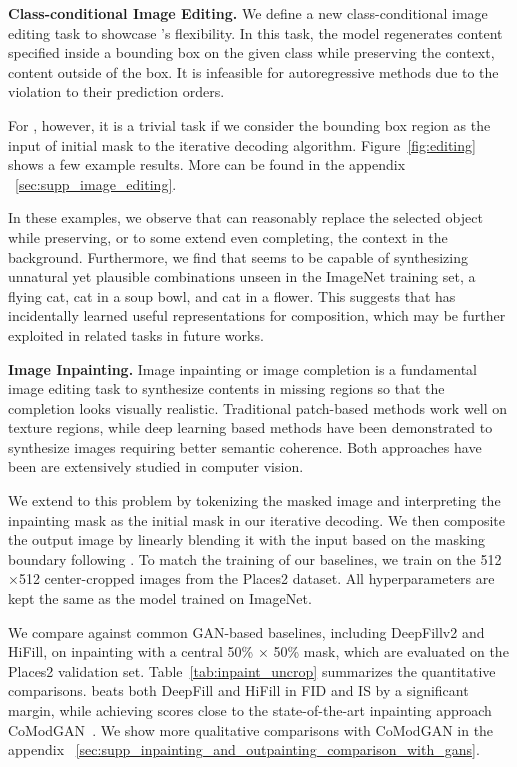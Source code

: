 \noindent\textbf{Class-conditional Image Editing.}
We define a new class-conditional image editing task to showcase \model's flexibility. In this task, the model regenerates content specified inside a bounding box on the given class while preserving the context, \ie content outside of the box. It is infeasible for autoregressive methods due to the violation to their prediction orders.

For \model, however, it is a trivial task if we consider the bounding box region as the input of initial mask to the iterative decoding algorithm. Figure~\ref{fig:editing} shows a few example results. More can be found in the appendix ~\ref{sec:supp_image_editing}.

In these examples, we observe that \model can reasonably replace the selected object while preserving, or to some extend even completing, the context in the background. Furthermore, we find that \model seems to be capable of synthesizing unnatural yet plausible combinations unseen in the ImageNet training set, \eg a flying cat, cat in a soup bowl, and cat in a flower. This suggests that \model has incidentally learned useful representations for composition, which may be further exploited in related tasks in future works.

\vspace{2mm}
\noindent\textbf{Image Inpainting.}
\label{ssec:inpainting}
Image inpainting or image completion is a fundamental image editing task to synthesize contents in missing regions so that the completion looks visually realistic. Traditional patch-based methods\cite{Barnes:2009:patchmatch} work well on texture regions, while deep learning based methods\cite{yu2019free, yi2020contextual, zhao2021comodgan, saharia2021palette, esser2021imagebart} have been demonstrated to synthesize images requiring better semantic coherence. Both approaches have been are extensively studied in computer vision.

We extend \model to this problem by tokenizing the masked image and interpreting the inpainting mask as the initial mask in our iterative decoding. We then composite the output image by linearly blending it with the input based on the masking boundary following \cite{cheng2021inout}.
To match the training of our baselines, we train \model on the 512$\times$512 center-cropped images from the Places2\cite{zhou2017places} dataset. All hyperparameters are kept the same as the \model model trained on ImageNet.

We compare \model against common GAN-based baselines, including DeepFillv2\cite{yu2019free} and HiFill\cite{yi2020contextual}, on inpainting with a central 50\% $\times$ 50\% mask, which are evaluated on the Places2 validation set. Table~\ref{tab:inpaint_uncrop} summarizes the quantitative comparisons. \model beats both DeepFill and HiFill in FID and IS by a significant margin, while achieving scores close to the state-of-the-art inpainting approach CoModGAN~\cite{zhao2021comodgan}. We show more qualitative comparisons with CoModGAN in the appendix ~\ref{sec:supp_inpainting_and_outpainting_comparison_with_gans}.


